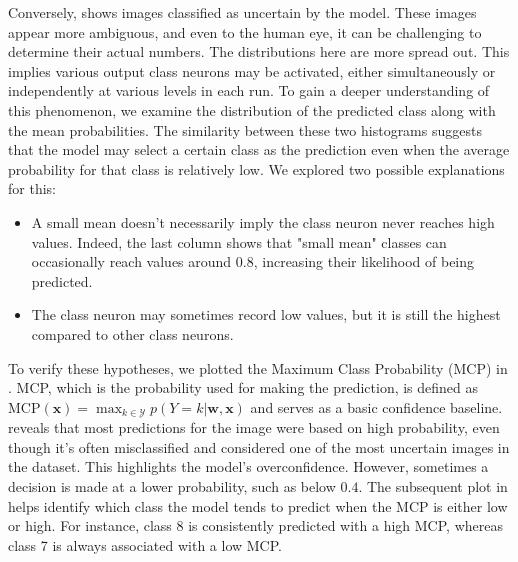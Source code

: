 Conversely,  shows images classified as uncertain by the model. These images appear more ambiguous, and even to the human eye, it can be challenging to determine their actual numbers. The distributions here are more spread out. This implies various output class neurons may be activated, either simultaneously or independently at various levels in each run. To gain a deeper understanding of this phenomenon, we examine the distribution of the predicted class along with the mean probabilities. The similarity between these two histograms suggests that the model may select a certain class as the prediction even when the average probability for that class is relatively low. We explored two possible explanations for this:
\begin{itemize}
    \item A small mean doesn't necessarily imply the class neuron never reaches high values. Indeed, the last column shows that "small mean" classes can occasionally reach values around $0.8$, increasing their likelihood of being predicted.
    \item The class neuron may sometimes record low values, but it is still the highest compared to other class neurons.
\end{itemize}
To verify these hypotheses, we plotted the Maximum Class Probability (MCP) in . MCP, which is the probability used for making the prediction, is defined as $ \text{MCP}(\boldsymbol{x}) = \max _{k \in \mathcal{Y}} p(Y=k | \boldsymbol{w}, \boldsymbol{x}) $ and serves as a basic confidence baseline.  reveals that most predictions for the image were based on high probability, even though it's often misclassified and considered one of the most uncertain images in the dataset. This highlights the model's overconfidence. However, sometimes a decision is made at a lower probability, such as below $ 0.4 $. The subsequent plot in  helps identify which class the model tends to predict when the MCP is either low or high. For instance, class 8 is consistently predicted with a high MCP, whereas class 7 is always associated with a low MCP.

